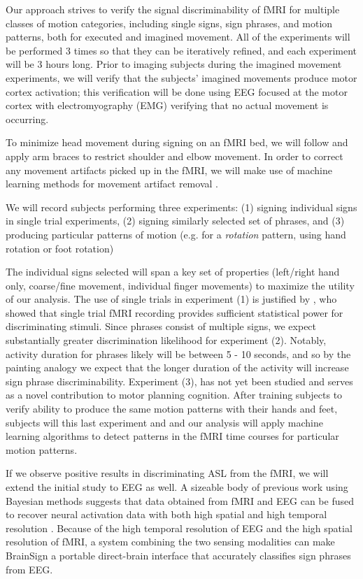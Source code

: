 \documentclass{proposal}
\begin{document}
Our approach strives to verify the signal discriminability of fMRI
for multiple classes of motion categories, including single signs, sign phrases, and motion patterns, both for executed and imagined movement. All of the experiments will be performed 3 times so that they can be iteratively refined, and each experiment will be 3 hours long. Prior to imaging
subjects during the imagined movement experiments, we will verify that the subjects' imagined movements produce motor cortex activation; this verification will be done using EEG focused at the motor cortex with electromyography (EMG) verifying that no actual movement is occurring.

To minimize head movement during signing on an fMRI bed, we will follow \cite{culham2003vgg} and apply arm braces to restrict shoulder and elbow movement. In order to correct any movement artifacts picked up in the fMRI, we will make use of machine learning methods for movement artifact removal \cite{mckeown1998afd}.

We will record subjects performing three experiments: (1) signing individual signs in single trial experiments, (2) signing similarly selected set of phrases, and (3) producing particular patterns of motion (e.g. for a \textit{rotation} pattern, using hand rotation or foot rotation)

The individual signs selected will span a key set of properties (left/right hand only, coarse/fine movement, individual finger movements) to maximize the utility of our analysis. The use of single trials in experiment (1) is justified by \cite{buckner1996dca}, who showed that single trial fMRI recording provides sufficient statistical power for discriminating stimuli. Since phrases consist of multiple signs, we expect substantially greater discrimination likelihood for experiment (2). Notably, activity duration for phrases likely will be between 5 - 10 seconds, and so by the painting analogy we expect that the longer duration of the activity will increase sign phrase discriminability. Experiment (3), has not yet been studied and serves as a novel contribution to motor planning cognition. After training subjects to verify ability to produce the same motion patterns with their hands and feet, subjects will this last experiment and and our analysis will apply machine learning algorithms to detect patterns in the fMRI time courses for particular motion patterns.


If we observe positive results in discriminating ASL from the fMRI, we will extend the initial study to EEG as well. A sizeable body of previous work using Bayesian methods suggests that data obtained from fMRI and EEG can be fused to recover neural activation data with both high spatial and high temporal resolution \cite{im2006tcm, ahlfors1999sac, wagner2000fcd, dale2000dsp}. Because of the high temporal resolution of EEG and the high spatial resolution of fMRI, a system combining the two sensing modalities can make BrainSign a portable direct-brain interface that accurately classifies sign phrases from EEG.
\end{document}
